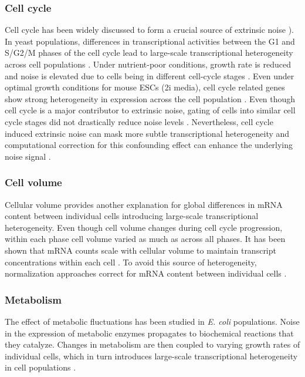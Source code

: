 \subsubsection{Cell cycle}

Cell cycle has been widely discussed to form a crucial source of extrinsic noise \citep{Colman-Lerner2005a, Newman2006}). In yeast populations, differences in transcriptional activities between the G1 and S/G2/M phases of the cell cycle lead to large-scale transcriptional heterogeneity across cell populations \citep{Zopf2013}. Under nutrient-poor conditions, growth rate is reduced and noise is elevated due to cells being in different cell-cycle stages \citep{Keren2015}.  Even under optimal growth conditions for mouse ESCs (2i media), cell cycle related genes show strong heterogeneity in expression across the cell population \citep{Kolodziejczyk2015cell}. Even though cell cycle is a major contributor to extrinsic noise, gating of cells into similar cell cycle stages did not drastically reduce noise levels \citep{Raser2004}. Nevertheless, cell cycle induced extrinsic noise can mask more subtle transcriptional heterogeneity and computational correction for this confounding effect can enhance the underlying noise signal \citep{Buettner2015}. 

\subsubsection{Cell volume}

Cellular volume provides another explanation for global differences in mRNA content between individual cells introducing large-scale transcriptional heterogeneity. Even though cell volume changes during cell cycle progression, within each phase cell volume varied as much as across all phases. It has been shown that mRNA counts scale with cellular volume to maintain transcript concentrations within each cell \citep{Kempe2015, Padovan-Merhar2015, Zhurinsky2010}. To avoid this source of heterogeneity, normalization approaches correct for mRNA content between individual cells \citep{Vallejos2017}.

\subsubsection{Metabolism}

The effect of metabolic fluctuations has been studied in \textit{E. coli} populations. Noise in the expression of metabolic enzymes propagates to biochemical reactions that they catalyze. Changes in metabolism are then coupled to varying growth rates of individual cells, which in turn introduces large-scale transcriptional heterogeneity in cell populations \citep{Kiviet2014}.  

